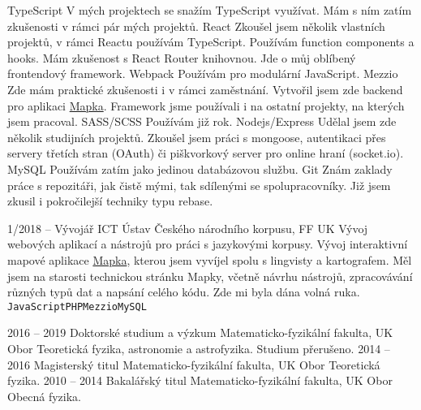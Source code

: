 \documentclass[9pt]{developercv} %
\begin{document}

\begin{entrylist}
	\entryShorter
		{TypeScript}
		{V mých projektech se snažím TypeScript využívat. Mám s ním
		zatím zkušenosti v rámci pár mých projektů.}
	\entryShorter
		{React}
		{Zkoušel jsem několik vlastních projektů, v rámci Reactu používám
		TypeScript. Používám function components a hooks. Mám zkušenost s
		React Router knihovnou. Jde o můj oblíbený frontendový framework.}
	\entryShorter
		{Webpack}
		{Používám pro modulární JavaScript.}
	\entryShorter
		{Mezzio}
		{Zde mám praktické zkušenosti i v rámci zaměstnání.
		Vytvořil jsem zde backend pro aplikaci \href{https://korpus.cz/mapka/}{Mapka}.
		Framework jsme používali i na ostatní projekty, na kterých jsem pracoval.}
	\entryShorter
		{SASS/SCSS}
		{Používám již rok.}
	\entryShorter
		{Nodejs/Express}
		{Udělal jsem zde několik studijních projektů. Zkoušel
		jsem práci s mongoose, autentikaci přes servery třetích stran
		(OAuth) či piškvorkový server pro online hraní (socket.io).}
	\entryShorter
		{MySQL}
		{Používám zatím jako jedinou databázovou službu.}
	\entryShorter
		{Git}
		{Znám zaklady práce s repozitáři, jak čistě mými, tak
		sdílenými se spolupracovníky. Již jsem zkusil i pokročilejší
		techniky typu rebase.}
\end{entrylist}


\begin{entrylist}
	\entry
		{1/2018 -- }
		{Vývojář ICT}
		{Ústav Českého národního korpusu, FF UK}
		{Vývoj webových aplikací a nástrojů pro práci s jazykovými korpusy. Vývoj interaktivní
		mapové aplikace \href{https://korpus.cz/mapka/}{Mapka}, kterou jsem vyvíjel
		spolu s lingvisty a kartografem. Měl jsem na starosti technickou stránku Mapky,
		včetně návrhu nástrojů, zpracovávání různých typů dat a napsání
		celého kódu. Zde mi byla dána volná ruka.\\
		\texttt{JavaScript}\slashsep\texttt{PHP}\slashsep\texttt{Mezzio}\slashsep\texttt{MySQL}}
\end{entrylist}



\begin{entrylist}
	\entry
		{2016 -- 2019}
		{Doktorské studium a výzkum}
		{Matematicko-fyzikální fakulta, UK}
		{Obor Teoretická fyzika, astronomie a astrofyzika. Studium přerušeno.}
	\entry
		{2014 -- 2016}
		{Magisterský titul}
		{Matematicko-fyzikální fakulta, UK}
		{Obor Teoretická fyzika.}
	\entry
		{2010 -- 2014}
		{Bakalářský titul}
		{Matematicko-fyzikální fakulta, UK}
		{Obor Obecná fyzika.}
\end{entrylist}
\end{document}
